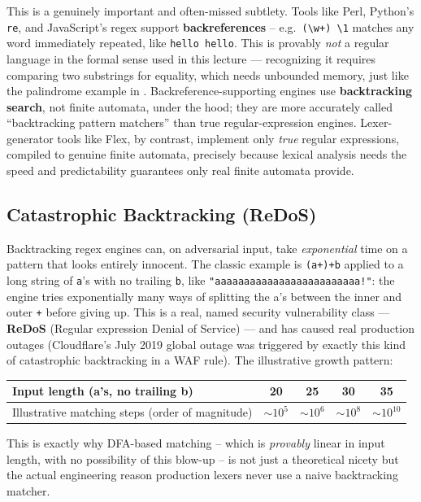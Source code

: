 \documentclass[full-course-notes.tex]{subfiles}
\begin{document}
This is a genuinely important and often-missed subtlety. Tools like Perl, Python's \texttt{re},
and JavaScript's regex support \textbf{backreferences} -- e.g.\ \texttt{(\textbackslash w+)
\textbackslash1} matches any word immediately repeated, like \texttt{hello hello}. This is
provably \emph{not} a regular language in the formal sense used in this lecture --- recognizing
it requires comparing two substrings for equality, which needs unbounded memory, just like the
palindrome example in . Backreference-supporting engines use
\textbf{backtracking search}, not finite automata, under the hood; they are more accurately
called ``backtracking pattern matchers'' than true regular-expression engines. Lexer-generator
tools like Flex, by contrast, implement only \emph{true} regular expressions, compiled to
genuine finite automata, precisely because lexical analysis needs the speed and predictability
guarantees only real finite automata provide.

\subsection{Catastrophic Backtracking (ReDoS)}

Backtracking regex engines can, on adversarial input, take \emph{exponential} time on a pattern
that looks entirely innocent. The classic example is \verb|(a+)+b| applied to a long string of
\texttt{a}'s with no trailing \texttt{b}, like \texttt{"aaaaaaaaaaaaaaaaaaaaaaaaa!"}: the engine
tries exponentially many ways of splitting the a's between the inner and outer \texttt{+} before
giving up. This is a real, named security vulnerability class --- \textbf{ReDoS} (Regular
expression Denial of Service) --- and has caused real production outages (Cloudflare's July 2019
global outage was triggered by exactly this kind of catastrophic backtracking in a WAF rule).
The illustrative growth pattern:
\begin{center}
\small
\begin{tabular}{@{}lcccc@{}}
\toprule
Input length (a's, no trailing b) & 20 & 25 & 30 & 35 \\
\midrule
Illustrative matching steps (order of magnitude) & $\sim 10^5$ & $\sim 10^6$ & $\sim 10^8$ & $\sim 10^{10}$ \\
\bottomrule
\end{tabular}
\end{center}
This is exactly why DFA-based matching -- which is \emph{provably} linear in input length, with
no possibility of this blow-up -- is not just a theoretical nicety but the actual engineering
reason production lexers never use a naive backtracking matcher.
\end{document}

